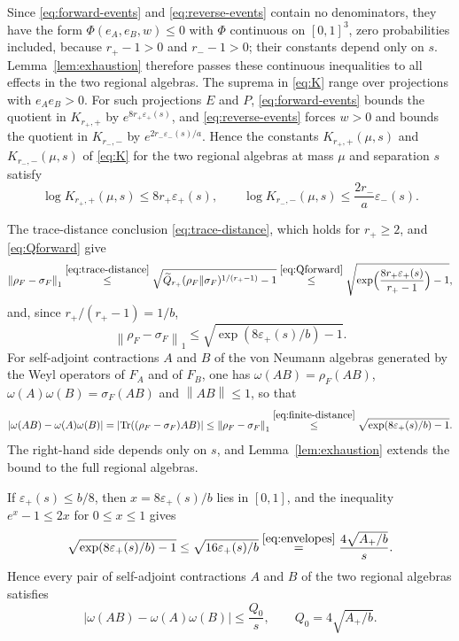 \documentclass[11pt]{amsart}
\numberwithin{equation}{section}
\theoremstyle{definition}
\newcommand{\Qtil}{\widetilde Q}
\newcommand{\Tr}{\operatorname{Tr}}
\newcommand{\norm}[1]{\left\|#1\right\|}
\begin{document}
Since \eqref{eq:forward-events} and \eqref{eq:reverse-events} contain no
denominators, they have the form \(\Phi(e_A,e_B,w)\le0\) with
\(\Phi\) continuous on \([0,1]^3\), zero probabilities included, because
\(r_+-1>0\) and \(r_--1>0\); their constants depend only on \(s\).
Lemma~\ref{lem:exhaustion} therefore passes these continuous
inequalities to all effects in the two regional algebras. The suprema
in \eqref{eq:K} range over projections with
\(e_Ae_B>0\). For such projections \(E\) and \(P\),
\eqref{eq:forward-events} bounds the quotient in \(K_{r_+,+}\) by
\(e^{8r_+\varepsilon_+(s)}\), and
\eqref{eq:reverse-events} forces \(w>0\) and bounds the quotient in
\(K_{r_-,-}\) by \(e^{2r_-\varepsilon_-(s)/a}\). Hence the constants \(K_{r_+,+}(\mu,s)\) and
\(K_{r_-,-}(\mu,s)\) of \eqref{eq:K} for the two regional algebras at mass
\(\mu\) and separation \(s\) satisfy
\begin{equation}
 \log K_{r_+,+}(\mu,s)\le8r_+\varepsilon_+(s),\qquad
 \log K_{r_-,-}(\mu,s)\le\frac{2r_-}{a}\varepsilon_-(s).
 \label{eq:full-K}
\end{equation}

The trace-distance conclusion \eqref{eq:trace-distance}, which holds
for \(r_+\ge2\), and \eqref{eq:Qforward} give
\[
 \norm{\rho_F-\sigma_F}_1
 \overset{\eqref{eq:trace-distance}}{\le}
 \sqrt{\Qtil_{r_+}(\rho_F\|\sigma_F)^{1/(r_+-1)}-1}
 \overset{\eqref{eq:Qforward}}{\le}
 \sqrt{\exp\Bigl(\frac{8r_+\varepsilon_+(s)}{r_+-1}\Bigr)-1},
\]
and, since \(r_+/(r_+-1)=1/b\),
\begin{equation}
 \norm{\rho_F-\sigma_F}_1
 \le\sqrt{\exp(8\varepsilon_+(s)/b)-1}.
 \label{eq:finite-distance}
\end{equation}
For self-adjoint contractions \(A\) and \(B\) of the von Neumann
algebras generated by the Weyl operators of \(F_A\) and of \(F_B\), one
has \(\omega(AB)=\rho_F(AB)\), \(\omega(A)\omega(B)=\sigma_F(AB)\) and
\(\norm{AB}\le1\), so that
\[
 |\omega(AB)-\omega(A)\omega(B)|
 =\lvert\Tr((\rho_F-\sigma_F)AB)\rvert
 \le\norm{\rho_F-\sigma_F}_1
 \overset{\eqref{eq:finite-distance}}{\le}
 \sqrt{\exp(8\varepsilon_+(s)/b)-1}.
\]
The right-hand side depends only on \(s\), and
Lemma~\ref{lem:exhaustion} extends the bound to the full regional
algebras.

If \(\varepsilon_+(s)\le b/8\), then \(x=8\varepsilon_+(s)/b\)
lies in \([0,1]\), and the inequality \(e^x-1\le2x\) for \(0\le x\le1\)
gives
\[
 \sqrt{\exp(8\varepsilon_+(s)/b)-1}
 \le\sqrt{16\varepsilon_+(s)/b}
 \overset{\eqref{eq:envelopes}}{=}\frac{4\sqrt{A_+/b}}{s}.
\]
Hence every pair of self-adjoint contractions \(A\) and \(B\) of the
two regional algebras satisfies
\begin{equation}
 |\omega(AB)-\omega(A)\omega(B)|
 \le\frac{Q_0}{s},\qquad
 Q_0=4\sqrt{A_+/b}.
 \label{eq:mass-uniform-cluster}
\end{equation}
\end{document}
